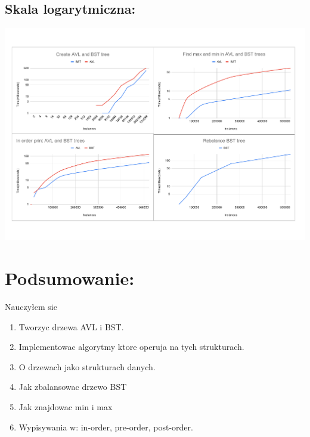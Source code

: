 \documentclass[12pt]{article}
\begin{document}
\subsection{Skala logarytmiczna: }

\begin{center}

\includegraphics[width=\linewidth]{wykresy_obok_0.pdf}

\end{center}

\section{Podsumowanie: }

Nauczyłem sie

\begin{enumerate}

	\item
	      Tworzyc drzewa AVL i BST.
	\item
		  Implementowac algorytmy ktore operuja na tych strukturach.
	\item
		  O drzewach jako strukturach danych.
	\item
		  Jak zbalansowac drzewo BST
	\item
		  Jak znajdowac min i max
    \item
    	      Wypisywania w: in-order, pre-order, post-order.

\end{enumerate}

\begin{center}

\tableofcontents

\end{center}
\end{document}
